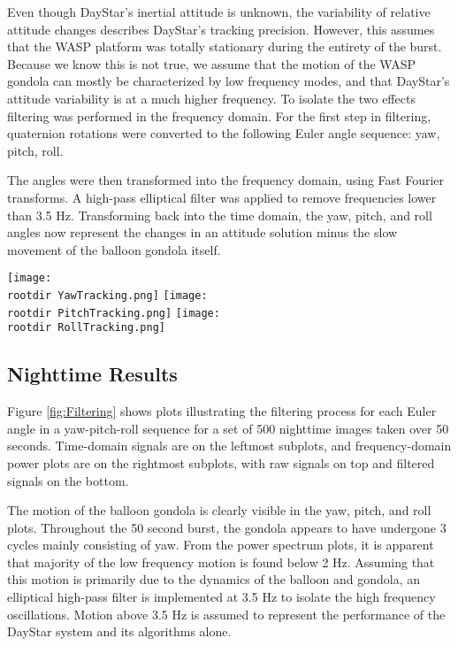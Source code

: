 \documentclass[twocolumn,letterpaper]{IEEEAerospace2012}
\newcommand{\rootdir}{./Figures/}
\begin{document}
Even though DayStar's inertial attitude is unknown, the variability of relative attitude changes describes DayStar's tracking precision. However, this assumes that the WASP platform was totally stationary during the entirety of the burst. Because we know this is not true, we assume that the motion of the WASP gondola can mostly be characterized by low frequency modes, and that DayStar's attitude variability is at a much higher frequency. To isolate the two effects filtering was performed in the frequency domain. For the first step in filtering, quaternion rotations were converted to the following Euler angle sequence: yaw, pitch, roll.

The angles were then transformed into the frequency domain, using Fast Fourier transforms. A high-pass elliptical filter was applied to remove frequencies lower than 3.5 Hz. Transforming back into the time domain, the yaw, pitch, and roll angles now represent the changes in an attitude solution minus the slow movement of the balloon gondola itself.\pagebreak


\onecolumn
\begin{figure*}[hp]
    \centering
    \texttt{[image: \\rootdir YawTracking.png]}
    \texttt{[image: \\rootdir PitchTracking.png]}
    \texttt{[image: \\rootdir RollTracking.png]}
    \caption{The yaw, pitch, and roll error signals are isolated using an FFT and a high-pass elliptical filter at 3.5 Hz.}
    \label{fig:Filtering}
\end{figure*}

\twocolumn
\subsection{Nighttime Results}
Figure \ref{fig:Filtering} shows plots illustrating the filtering process for each Euler angle in a yaw-pitch-roll sequence for a set of 500 nighttime images taken over 50 seconds. Time-domain signals are on the leftmost subplots, and frequency-domain power plots are on the rightmost subplots, with raw signals on top and filtered signals on the bottom.

The motion of the balloon gondola is clearly visible in the yaw, pitch, and roll plots. Throughout the 50 second burst, the gondola appears to have undergone 3 cycles mainly consisting of yaw. From the power spectrum plots, it is apparent that majority of the low frequency motion is found below 2 Hz. Assuming that this motion is primarily due to the dynamics of the balloon and gondola, an elliptical high-pass filter is implemented at 3.5 Hz to isolate the high frequency oscillations. Motion above 3.5 Hz is assumed to represent the performance of the DayStar system and its algorithms alone.
\end{document}

